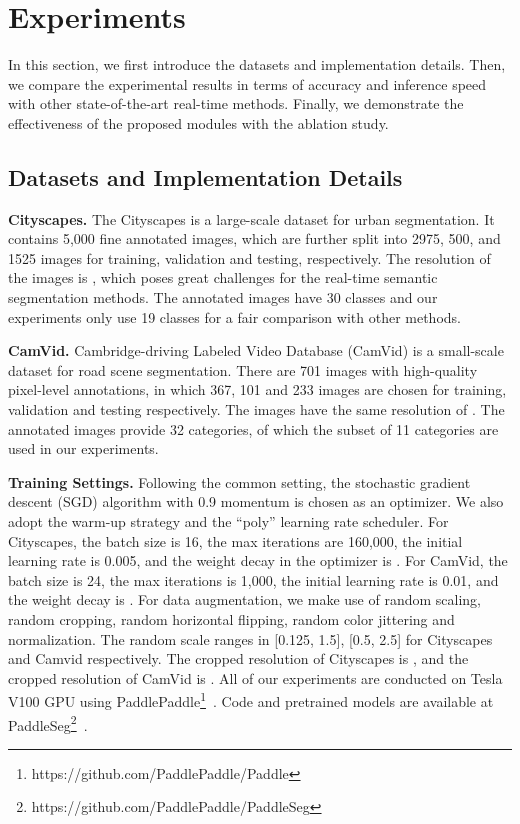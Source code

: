 \documentclass[10pt,twocolumn,letterpaper]{article}
\begin{document}
\section{Experiments}
\label{sec:experiments}
In this section, we first introduce the datasets and implementation details.
Then, we compare the experimental results in terms of accuracy and inference speed with other state-of-the-art real-time methods.
Finally, we demonstrate the effectiveness of the proposed modules with the ablation study.

\subsection{Datasets and Implementation Details}

\noindent
\textbf{Cityscapes.}
The Cityscapes \cite{cordts2016cityscapes} is a large-scale dataset for urban segmentation.
It contains 5,000 fine annotated images, which are further split into 2975, 500, and 1525 images for training, validation and testing, respectively.
The resolution of the images is , which poses great challenges for the real-time semantic segmentation methods.
The annotated images have 30 classes and our experiments only use 19 classes for a fair comparison with other methods.


\noindent
\textbf{CamVid.}
Cambridge-driving Labeled Video Database (CamVid)  \cite{brostow2008segmentation} is a small-scale dataset for road scene segmentation.
There are 701 images with high-quality pixel-level annotations, in which 367, 101 and 233 images are chosen for training, validation and testing respectively. 
The images have the same resolution of .
The annotated images provide 32 categories, of which the subset of 11 categories are used in our experiments.


\noindent
\textbf{Training Settings.}
Following the common setting, the stochastic gradient descent (SGD) algorithm with 0.9 momentum is chosen as an optimizer.
We also adopt the warm-up strategy and the “poly” learning rate scheduler.
For Cityscapes, the batch size is 16, the max iterations are 160,000, the initial learning rate is 0.005, and the weight decay in the optimizer is .
For CamVid, the batch size is 24, the max iterations is 1,000, the initial learning rate is 0.01, and the weight decay is .
For data augmentation, we make use of random scaling, random cropping, random horizontal flipping, random color jittering and normalization. The random scale ranges in [0.125, 1.5], [0.5, 2.5] for Cityscapes and Camvid respectively. The cropped resolution of Cityscapes is , and the cropped resolution of CamVid is .
All of our experiments are conducted on Tesla V100 GPU using PaddlePaddle\footnote{https://github.com/PaddlePaddle/Paddle}~\cite{ma2019paddlepaddle}. Code and pretrained models are available at PaddleSeg\footnote{https://github.com/PaddlePaddle/PaddleSeg}~\cite{liu2021paddleseg}.
\end{document}
